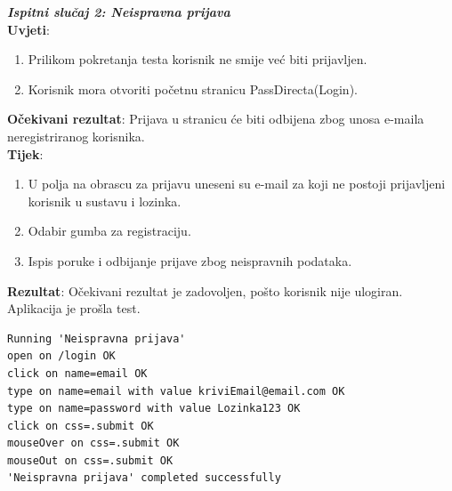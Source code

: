 {{{\noindent \textbf{\textit{Ispitni slučaj 2: Neispravna prijava}}\\
\textbf{Uvjeti}:
			 \begin{enumerate}
				\item Prilikom pokretanja testa korisnik ne smije već biti prijavljen.
				\item Korisnik mora otvoriti početnu stranicu PassDirecta(Login).
			 \end{enumerate}
\textbf{Očekivani rezultat}: Prijava u stranicu će biti odbijena zbog unosa e-maila neregistriranog korisnika.\\
\textbf{Tijek}:
			 \begin{enumerate}
			 	\item U polja na obrascu za prijavu uneseni su e-mail za koji ne postoji prijavljeni korisnik u sustavu i lozinka.
			 	\item Odabir gumba za registraciju.
			 	\item Ispis poruke i odbijanje prijave zbog neispravnih podataka.
			 \end{enumerate}
			 \noindent \textbf{Rezultat}:
			 Očekivani rezultat je zadovoljen, pošto korisnik nije ulogiran. Aplikacija je prošla test. \\


\begin{lstlisting}
Running 'Neispravna prijava'
open on /login OK
click on name=email OK
type on name=email with value kriviEmail@email.com OK
type on name=password with value Lozinka123 OK
click on css=.submit OK
mouseOver on css=.submit OK
mouseOut on css=.submit OK
'Neispravna prijava' completed successfully
\end{lstlisting}}\hfill\break





}}
